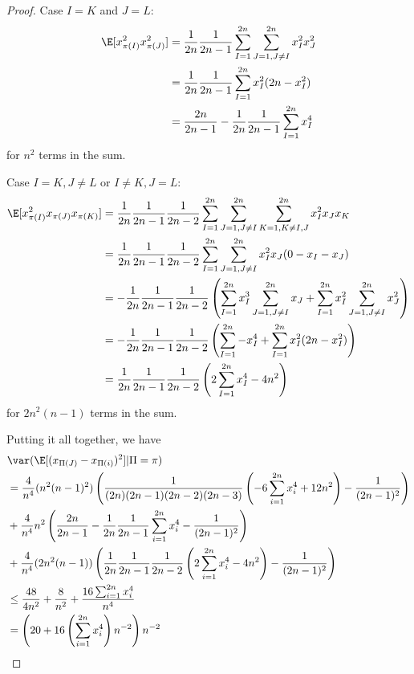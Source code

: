 \begin{proof}
  Case $I=K$ and $J=L$:
  \begin{align*}
    \E[x_{\pi(I)}^2 x_{\pi(J)}^2] &= \frac{1}{2n}\frac{1}{2n-1} \sum_{I=1}^{2n}
    \sum_{J=1, J\neq I}^{2n} x_{I}^2 x_{J}^2 \\
    &= \frac{1}{2n}\frac{1}{2n-1} \sum_{I=1}^{2n} x_{I}^2 (2n - x_{I}^2) \\
    &= \frac{2n}{2n-1}-\frac{1}{2n}\frac{1}{2n-1} \sum_{I=1}^{2n} x_{I}^4
  \end{align*}
  for $n^2$ terms in the sum.

  Case $I=K, J\neq L$ or $I\neq K, J= L$:
  \begin{align*}
    \E[x_{\pi(I)}^2 x_{\pi(J)} x_{\pi(K)}] &= \frac{1}{2n}\frac{1}{2n-1}\frac{1}{2n-2} \sum_{I=1}^{2n}
    \sum_{J=1, J\neq I}^{2n} \sum_{K=1, K \neq I,J}^{2n} x_{I}^2 x_{J} x_{K} \\
    &=\frac{1}{2n}\frac{1}{2n-1}\frac{1}{2n-2} \sum_{I=1}^{2n}
    \sum_{J=1, J\neq I}^{2n} x_{I}^2 x_{J} (0 - x_{I} - x_{J}) \\
    &=-\frac{1}{2n}\frac{1}{2n-1}\frac{1}{2n-2} \left(
      \sum_{I=1}^{2n} x_{I}^3 \sum_{J=1, J\neq I}^{2n} x_{J} +
      \sum_{I=1}^{2n} x_{I}^2 \sum_{J=1, J\neq I}^{2n} x_{J}^2
    \right ) \\
    &=-\frac{1}{2n}\frac{1}{2n-1}\frac{1}{2n-2} \left(
      \sum_{I=1}^{2n} - x_{I}^4 +
      \sum_{I=1}^{2n} x_{I}^2 (2n - x_{I}^2)
    \right ) \\
    &=\frac{1}{2n}\frac{1}{2n-1}\frac{1}{2n-2} \left(
      2 \sum_{I=1}^{2n} x_{I}^4 -4n^2 \right )
  \end{align*}
  for $2n^2(n-1)$ terms in the sum.

  Putting it all together, we have
  \begin{align*}
    &\var (\E[(x_{\Pi(J)}-x_{\Pi(i)})^2] | \Pi = \pi) \\
    &= \frac{4}{n^4} (n^2(n-1)^2)
    \left ( \frac{1}{(2n)(2n-1)(2n-2)(2n-3)}
      \left ( -6\sum_{i=1}^{2n}x_{i}^4 + 12n^2 \right ) - \frac{1}{(2n-1)^2} \right ) \\
    &+ \frac{4}{n^4} n^2 \left ( \frac{2n}{2n-1} -
      \frac{1}{2n}\frac{1}{2n-1}\sum_{i=1}^{2n}x_{i}^4 - \frac{1}{(2n-1)^2}
    \right ) \\
    &+ \frac{4}{n^4} (2n^2(n-1)) \left (
      \frac{1}{2n}\frac{1}{2n-1}\frac{1}{2n-2}\left (
        2 \sum_{i=1}^{2n} x_{i}^4 - 4n^2 \right ) - \frac{1}{(2n-1)^2}
    \right ) \\
    &\leq \frac{48}{4n^2} + \frac{8}{n^2} + \frac{16 \sum_{i=1}^{2n}
      x_{i}^4}{n^4} \\
    &= \left ( 20 + 16 \left ( \sum_{i=1}^{2n} x_{i}^4 \right )n^{-2} \right ) n^{-2}
  \end{align*}


\end{proof}
